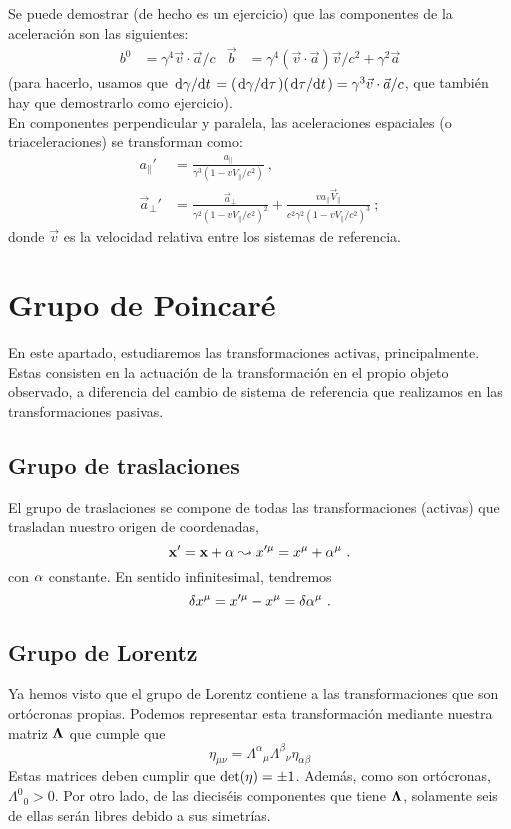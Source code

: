 Se puede demostrar (de hecho es un ejercicio) que las componentes de la aceleración son las siguientes:
\begin{align*}
    b^0 &= \gamma^4 \vec{v}\cdot \vec{a}/c  &  \vec{b} &= \gamma^4 (\vec{v}\cdot \vec{a})\vec{v}/c^2 + \gamma^2 \vec{a}
\end{align*}
(para hacerlo, usamos que $\dv*{\gamma}{t} = (\dv*{\gamma }{\tau}) (\dv*{\tau}{t}) = \gamma^3 \vec{v}\cdot \vec{a}/c$, que también hay que demostrarlo como ejercicio). \\

En componentes perpendicular y paralela, las aceleraciones espaciales (o triaceleraciones) se transforman como:
\begin{align*}
    a_\parallel '   &= \frac{a_\parallel}{\gamma^3 (1-vV_\parallel /c^2)} \ ,\\
    \vec{a}_\perp ' &= \frac{\vec{a}_\perp }{\gamma^2 (1-vV_\parallel/c^2)^2} + \frac{v a_\parallel \vec{V}_\parallel }{c^2 \gamma^2 (1-vV_\parallel /c^2)^3}\ ;
\end{align*}
donde $\vec{v}$ es la velocidad relativa entre los sistemas de referencia. 
\section{Grupo de Poincaré}
En este apartado, estudiaremos las transformaciones activas, principalmente. Estas consisten en la actuación de la transformación en el propio objeto observado, a diferencia del cambio de sistema de referencia que realizamos en las transformaciones pasivas. 
\subsection{Grupo de traslaciones}
El grupo de traslaciones se compone de todas las transformaciones (activas) que trasladan nuestro origen de coordenadas,
$$
\mathbf{x}' = \mathbf{x} + \mathbf{\alpha} \leadsto x'^\mu  = x^\mu + \alpha ^\mu \ .
$$
con $\mathbf{\alpha} $ constante. En sentido infinitesimal, tendremos $$\var x^\mu = x'^\mu - x^\mu = \var \alpha ^\mu \ .$$ 
\subsection{Grupo de Lorentz}
Ya hemos visto que el grupo de Lorentz contiene a las transformaciones que son ortócronas propias. Podemos representar esta transformación mediante nuestra matriz $\mathbf{\Lambda}$ que cumple que 
$$
\eta_{\mu \nu } = \Lambda ^{\alpha  }{}_{\mu }\Lambda^\beta {}_\nu \eta_{\alpha \beta }
$$
Estas matrices deben cumplir que $\det(\mathbf{\eta}) = \pm 1$. Además, como son ortócronas, $\Lambda^0{}_0 > 0$. Por otro lado, de las dieciséis componentes que tiene $\mathbf{\Lambda}$, solamente seis de ellas serán libres debido a sus simetrías. \\


